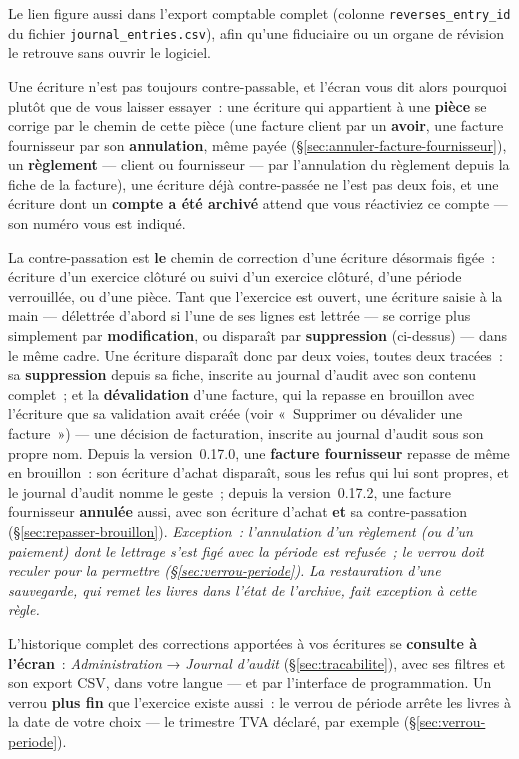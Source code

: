 \documentclass[a4paper,11pt,oneside]{article}
\begin{document}
Le lien figure aussi dans l'export comptable complet (colonne
\texttt{reverses\_entry\_id} du fichier \texttt{journal\_entries.csv}), afin qu'une
fiduciaire ou un organe de révision le retrouve sans ouvrir le logiciel.

Une écriture n'est pas toujours contre-passable, et l'écran vous dit alors pourquoi plutôt
que de vous laisser essayer~: une écriture qui appartient à une \textbf{pièce} se corrige
par le chemin de cette pièce (une facture client par un \textbf{avoir}, une facture
fournisseur par son \textbf{annulation}, même payée (\S\ref{sec:annuler-facture-fournisseur}), un \textbf{règlement} --- client ou fournisseur --- par
l'annulation du règlement depuis la fiche de la facture), une écriture déjà contre-passée ne l'est pas deux
fois, et une écriture dont un \textbf{compte a été archivé} attend que vous réactiviez ce
compte --- son numéro vous est indiqué.

\begin{keshnote}
La contre-passation est \textbf{le} chemin de correction d'une écriture désormais
figée~: écriture d'un exercice clôturé ou suivi d'un exercice clôturé, d'une période
verrouillée, ou d'une pièce. Tant que l'exercice est ouvert, une écriture saisie à la main
--- délettrée d'abord si l'une de ses lignes est lettrée ---
se corrige plus simplement par \textbf{modification}, ou disparaît par \textbf{suppression}
(ci-dessus) --- dans le même cadre. Une écriture disparaît donc par deux voies, toutes deux
tracées~: sa \textbf{suppression} depuis sa fiche, inscrite au journal d'audit avec son contenu
complet~; et la \textbf{dévalidation} d'une facture, qui la repasse en brouillon avec l'écriture
que sa validation avait créée (voir «~Supprimer ou dévalider une facture~») --- une décision de
facturation, inscrite au journal d'audit sous son propre nom. Depuis la version~0.17.0, une
\textbf{facture fournisseur} repasse de même en brouillon~: son écriture d'achat disparaît, sous
les refus qui lui sont propres, et le journal d'audit nomme le geste~; depuis la version~0.17.2,
une facture fournisseur \textbf{annulée} aussi, avec son écriture d'achat \textbf{et} sa
contre-passation (\S\ref{sec:repasser-brouillon}).
\emph{Exception~: l'annulation
d'un règlement (ou d'un paiement) dont le lettrage s'est figé avec la période est refusée~; le
verrou doit reculer pour la permettre (\S\ref{sec:verrou-periode}).} \emph{La restauration d'une
sauvegarde, qui remet les livres dans l'état de l'archive, fait exception à cette règle.}

L'historique complet des corrections apportées à vos écritures se \textbf{consulte à
l'écran}~: \emph{Administration} → \emph{Journal d'audit} (\S\ref{sec:tracabilite}), avec
ses filtres et son export CSV, dans votre langue --- et par l'interface de programmation. Un
verrou \textbf{plus fin} que l'exercice existe aussi~: le verrou de période arrête les livres
à la date de votre choix --- le trimestre TVA déclaré, par exemple
(\S\ref{sec:verrou-periode}).
\end{keshnote}
\end{document}
